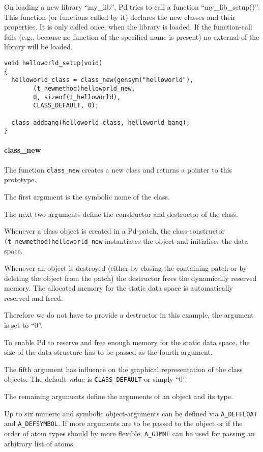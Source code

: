 \documentclass[12pt, a4paper,english,titlepage]{article}
\begin{document}
On loading a new library ``my\_lib'',
Pd tries to call a function ``my\_lib\_setup()''.
This function (or functions called by it) 
declares the new classes and their properties.
It is only called once, when the library is loaded.
If the function-call fails (e.g., because no function of the specified name is present)
no external of the library will be loaded.

\begin{verbatim}
void helloworld_setup(void)
{
  helloworld_class = class_new(gensym("helloworld"),
        (t_newmethod)helloworld_new,
        0, sizeof(t_helloworld),
        CLASS_DEFAULT, 0);

  class_addbang(helloworld_class, helloworld_bang);
}
\end{verbatim}

\paragraph{class\_new}

The function \verb+class_new+ creates a new class and returns a pointer to this prototype.

The first argument is the symbolic name of the class.

The next two arguments define the constructor and destructor of the class.

Whenever a class object is created in a Pd-patch,
the class-constructor \verb+(t_newmethod)helloworld_new+ instantiates the object
and initialises the data space.

Whenever an object is destroyed
(either by closing the containing patch or by deleting the object from the patch)
the destructor frees the dynamically reserved memory.
The allocated memory for the static data space is automatically reserved and freed.

Therefore we do not have to provide a destructor in this example, the argument
is set to ``0''.

To enable Pd to reserve and free enough memory for the static data space,
the size of the data structure has to be passed as the fourth argument.

The fifth argument has influence on the graphical representation of the class objects.
The default-value is \verb+CLASS_DEFAULT+ or simply ``0''.

The remaining arguments define the arguments of an object and its type.

Up to six numeric and symbolic object-arguments can be defined via
\verb+A_DEFFLOAT+ and \verb+A_DEFSYMBOL+.
If more arguments are to be passed to the object
or if the order of atom types should by more flexible, 
\verb+A_GIMME+ can be used for passing an arbitrary list of atoms.
\end{document}
